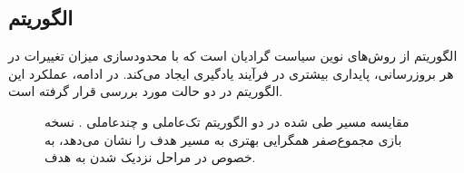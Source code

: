 \subsection{الگوریتم }

الگوریتم   از روش‌های نوین سیاست گرادیان است که با محدودسازی میزان تغییرات در هر بروزرسانی، پایداری بیشتری در فرآیند یادگیری ایجاد می‌کند. در ادامه، عملکرد این الگوریتم در دو حالت مورد بررسی قرار گرفته است.

\begin{figure}[H]
	\centering
	
	
	\caption{
		مقایسه مسیر طی شده در دو الگوریتم تک‌عاملی و چندعاملی .
		نسخه بازی مجموع‌صفر همگرایی بهتری به مسیر هدف را نشان می‌دهد، به خصوص در مراحل نزدیک شدن به هدف.
	}
\end{figure}


